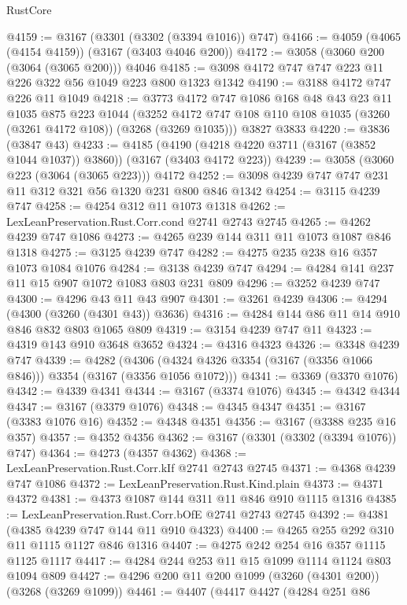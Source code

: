 \begin{lexlean}{RustCore}
\begin{coremodule}
@4159 := @3167 (@3301 (@3302 (@3394 @1016)) @747)
@4166 := @4059 (@4065 (@4154 @4159)) (@3167 (@3403 @4046 @200))
@4172 := @3058 (@3060 @200 (@3064 (@3065 @200))) @4046
@4185 := @3098 @4172 @747 @747 @223 @11 @226 @322 @56 @1049 @223 @800 @1323 @1342
@4190 := @3188 @4172 @747 @226 @11 @1049
@4218 := @3773
    @4172
    @747
    @1086
    @168
    @48
    @43
    @23
    @11
    @1035
    @875
    @223
    @1044
    (@3252 @4172 @747 @108 @110 @108 @1035 (@3260 (@3261 @4172 @108)) (@3268 (@3269 @1035)))
    @3827
    @3833
@4220 := @3836 (@3847 @43)
@4233 := @4185
    (@4190 (@4218 @4220 @3711 (@3167 (@3852 @1044 @1037)) @3860))
    (@3167 (@3403 @4172 @223))
@4239 := @3058 (@3060 @223 (@3064 (@3065 @223))) @4172
@4252 := @3098 @4239 @747 @747 @231 @11 @312 @321 @56 @1320 @231 @800 @846 @1342
@4254 := @3115 @4239 @747
@4258 := @4254 @312 @11 @1073 @1318
@4262 := LexLeanPreservation.Rust.Corr.cond @2741 @2743 @2745
@4265 := @4262 @4239 @747 @1086
@4273 := @4265 @239 @144 @311 @11 @1073 @1087 @846 @1318
@4275 := @3125 @4239 @747
@4282 := @4275 @235 @238 @16 @357 @1073 @1084 @1076
@4284 := @3138 @4239 @747
@4294 := @4284 @141 @237 @11 @15 @907 @1072 @1083 @803 @231 @809
@4296 := @3252 @4239 @747
@4300 := @4296 @43 @11 @43 @907
@4301 := @3261 @4239
@4306 := @4294 (@4300 (@3260 (@4301 @43)) @3636)
@4316 := @4284 @144 @86 @11 @14 @910 @846 @832 @803 @1065 @809
@4319 := @3154 @4239 @747 @11
@4323 := @4319 @143 @910 @3648 @3652
@4324 := @4316 @4323
@4326 := @3348 @4239 @747
@4339 := @4282
    (@4306 (@4324 @4326 @3354 (@3167 (@3356 @1066 @846))) @3354 (@3167 (@3356 @1056 @1072)))
@4341 := @3369 (@3370 @1076)
@4342 := @4339 @4341
@4344 := @3167 (@3374 @1076)
@4345 := @4342 @4344
@4347 := @3167 (@3379 @1076)
@4348 := @4345 @4347
@4351 := @3167 (@3383 @1076 @16)
@4352 := @4348 @4351
@4356 := @3167 (@3388 @235 @16 @357)
@4357 := @4352 @4356
@4362 := @3167 (@3301 (@3302 (@3394 @1076)) @747)
@4364 := @4273 (@4357 @4362)
@4368 := LexLeanPreservation.Rust.Corr.kIf @2741 @2743 @2745
@4371 := @4368 @4239 @747 @1086
@4372 := LexLeanPreservation.Rust.Kind.plain
@4373 := @4371 @4372
@4381 := @4373 @1087 @144 @311 @11 @846 @910 @1115 @1316
@4385 := LexLeanPreservation.Rust.Corr.bOfE @2741 @2743 @2745
@4392 := @4381 (@4385 @4239 @747 @144 @11 @910 @4323)
@4400 := @4265 @255 @292 @310 @11 @1115 @1127 @846 @1316
@4407 := @4275 @242 @254 @16 @357 @1115 @1125 @1117
@4417 := @4284 @244 @253 @11 @15 @1099 @1114 @1124 @803 @1094 @809
@4427 := @4296 @200 @11 @200 @1099 (@3260 (@4301 @200)) (@3268 (@3269 @1099))
@4461 := @4407
    (@4417
      @4427
      (@4284
        @251
        @86

\end{coremodule}
\end{lexlean}
